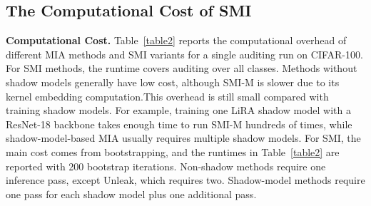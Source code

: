 \documentclass{article}
\theoremstyle{plain}
\theoremstyle{definition}
\theoremstyle{remark}
\begin{document}
\subsection{The Computational Cost of SMI}
\textbf{Computational Cost.}
Table~\ref{table2} reports the computational overhead of different MIA methods and SMI variants for a single auditing run on CIFAR-100. For SMI methods, the runtime covers auditing over all classes. Methods without shadow models generally have low cost, although SMI-M is slower due to its kernel embedding computation.This overhead is still small compared with training shadow models. For example, training one LiRA shadow model with a ResNet-18 backbone takes enough time to run SMI-M hundreds of times, while shadow-model-based MIA usually requires multiple shadow models. For SMI, the main cost comes from bootstrapping, and the runtimes in Table~\ref{table2} are reported with 200 bootstrap iterations. Non-shadow methods require one inference pass, except Unleak, which requires two. Shadow-model methods require one pass for each shadow model plus one additional pass.
\begin{table}[htbp]
\centering
{}
\label{table2}
\end{table}
\end{document}
